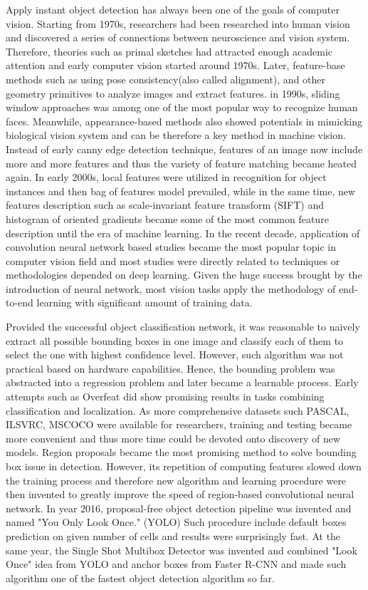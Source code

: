 \documentclass{article}
\begin{document}
Apply instant object detection has always been one of the goals of computer vision. Starting from 1970s, researchers had been researched into human vision and discovered a series of connections between neuroscience and vision system. Therefore, theories such as primal sketches had attracted enough academic attention and early computer vision started around 1970s. Later, feature-base methods such as using pose consistency(also called alignment), and other geometry primitives to analyze images and extract features. in 1990s, sliding window approaches was among one of the most popular way to recognize human faces. Meanwhile, appearance-based methods also showed potentials in mimicking biological vision system and can be therefore a key method in machine vision. Instead of early canny edge detection technique, features of an image now include more and more features and thus the variety of feature matching became heated again. In early 2000s, local features were utilized in recognition for object instances and then bag of features model prevailed, while in the same time, new features description such as scale-invariant feature transform (SIFT) and histogram of oriented gradients became some of the most common feature description until the era of machine learning. In the recent decade, application of convolution neural network based studies became the most popular topic in computer vision field and most studies were directly related to techniques or methodologies depended on deep learning. Given the huge success brought by the introduction of neural network, most vision tasks apply the methodology of end-to-end learning with significant amount of training data. 

Provided the successful object classification network, it was reasonable to naively extract all possible bounding boxes in one image and classify each of them to select the one with highest confidence level. However, such algorithm was not practical based on hardware capabilities. Hence, the bounding problem was abstracted into a regression problem and later became a learnable process. Early attempts such as Overfeat did show promising results in tasks combining classification and localization.
As more comprehensive datasets such PASCAL, ILSVRC, MSCOCO were available for researchers, training and testing became more convenient and thus more time could be devoted onto discovery of new models. Region proposals became the most promising method to solve bounding box issue in detection. However, its repetition of computing features slowed down the training process and therefore new algorithm and learning procedure were then invented to greatly improve the speed of region-based convolutional neural network. In year 2016, proposal-free object detection pipeline was invented and named "You Only Look Once." (YOLO) Such procedure include default boxes prediction on given number of cells and results were surprisingly fast. At the same year, the Single Shot Multibox Detector was invented and combined "Look Once" idea from YOLO and anchor boxes from Faster R-CNN and made such algorithm one of the fastest object detection algorithm so far.
\end{document}
